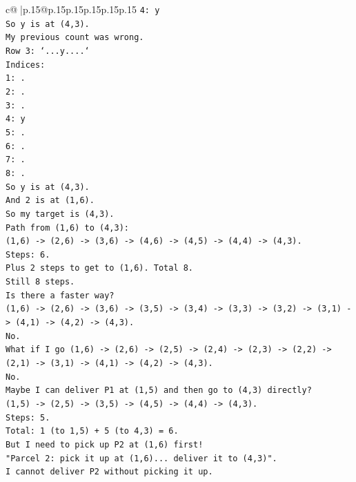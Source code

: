 \documentclass{article}
\begin{document}
{\begin{supertabular}{c@{$\;$}|p{.15\linewidth}@{}p{.15\linewidth}p{.15\linewidth}p{.15\linewidth}p{.15\linewidth}p{.15\linewidth}}
{{{\texttt{4: y} \\
\texttt{So y is at (4,3).} \\
\texttt{My previous count was wrong.} \\
\texttt{Row 3: `...y....`} \\
\texttt{Indices:} \\
\texttt{1: .} \\
\texttt{2: .} \\
\texttt{3: .} \\
\texttt{4: y} \\
\texttt{5: .} \\
\texttt{6: .} \\
\texttt{7: .} \\
\texttt{8: .} \\
\texttt{So y is at (4,3).} \\
\texttt{And 2 is at (1,6).} \\
\texttt{So my target is (4,3).} \\
\texttt{Path from (1,6) to (4,3):} \\
\texttt{(1,6) {-}> (2,6) {-}> (3,6) {-}> (4,6) {-}> (4,5) {-}> (4,4) {-}> (4,3).} \\
\texttt{Steps: 6.} \\
\texttt{Plus 2 steps to get to (1,6). Total 8.} \\
\texttt{Still 8 steps.} \\
\texttt{Is there a faster way?} \\
\texttt{(1,6) {-}> (2,6) {-}> (3,6) {-}> (3,5) {-}> (3,4) {-}> (3,3) {-}> (3,2) {-}> (3,1) {-}> (4,1) {-}> (4,2) {-}> (4,3).} \\
\texttt{No.} \\
\texttt{What if I go (1,6) {-}> (2,6) {-}> (2,5) {-}> (2,4) {-}> (2,3) {-}> (2,2) {-}> (2,1) {-}> (3,1) {-}> (4,1) {-}> (4,2) {-}> (4,3).} \\
\texttt{No.} \\
\texttt{Maybe I can deliver P1 at (1,5) and then go to (4,3) directly?} \\
\texttt{(1,5) {-}> (2,5) {-}> (3,5) {-}> (4,5) {-}> (4,4) {-}> (4,3).} \\
\texttt{Steps: 5.} \\
\texttt{Total: 1 (to 1,5) + 5 (to 4,3) = 6.} \\
\texttt{But I need to pick up P2 at (1,6) first!} \\
\texttt{"Parcel 2: pick it up at (1,6)... deliver it to (4,3)".} \\
\texttt{I cannot deliver P2 without picking it up.} \\
}}}
\end{supertabular}}
\end{document}
